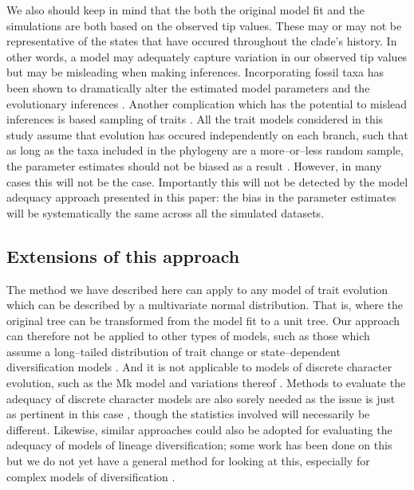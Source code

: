 \documentclass[a4paper,12pt]{article}
\begin{document}
We also should keep in mind that the both the original model fit and the simulations are both based on the observed tip values. These may or may not be representative of the states that have occured throughout the clade's history. In other words, a model may adequately capture variation in our observed tip values but may be misleading when making inferences. Incorporating fossil taxa has been shown to dramatically alter the estimated model parameters and the evolutionary inferences \citep{FineralliFylnn2006, Slater2012Fossil}. Another complication which has the potential to mislead inferences is based sampling of traits \citep{Freckletoninaction, FitzJohnwoody}. All the trait models considered in this study assume that evolution has occured independently on each branch, such that as long as the taxa included in the phylogeny are a more--or--less random sample, the parameter estimates should not be biased as a result \citep{PennellHarmon}. However, in many cases \citep[especially when using large trait databases;][]{FitzJohnwoody} this will not be the case. Importantly this will not be detected by the model adequacy approach presented in this paper: the bias in the parameter estimates will be systematically the same across all the simulated datasets.



\subsection*{Extensions of this approach}


The method we have described here can apply to any model of trait evolution which can be described by a multivariate normal distribution. That is, where the original tree can be transformed from the model fit to a unit tree. Our approach can therefore not be applied to other types of models, such as those which assume a long--tailed distribution of trait change \citep[e.g.][]{Landis2012} or state--dependent diversification models \citep[e.g.][]{Bokma2008, Bokma2010, FitzJohn2010}. And it is not applicable to models of discrete character evolution, such as the Mk model \citep{Pagel1994, Lewis2001} and variations thereof \citep[e.g.][]{Maddison2007, WagnerMarcot2010, Mazeralli2012, Beaulieu2013} \citep[but see Felsenstein's threshold model;][]{Felsenstein2005, Felsenstein2012}. Methods to evaluate the adequacy of discrete character models are also sorely needed as the issue is just as pertinent in this case \citep{ReadNee1995}, though the statistics involved will necessarily be different. Likewise, similar approaches could also be adopted for evaluating the adequacy of models of lineage diversification; some work has been done on this \citep[e.g.][]{Rabosky2009AmNat, Rabosky2012} but we do not yet have a general method for looking at this, especially for complex models of diversification \citep[e.g.][]{Stadler2011, Etienne2012}.
\end{document}
